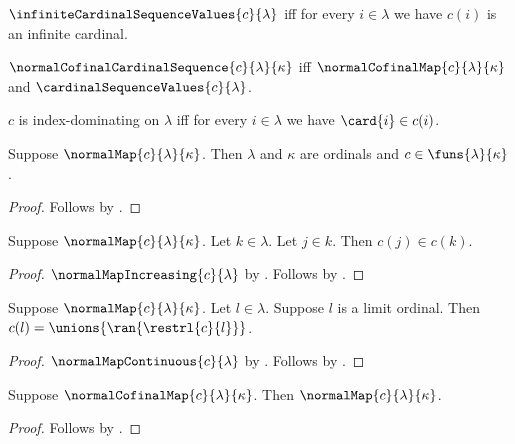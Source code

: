 \begin{definition}\label{infinite_cardinal_sequence_values}
    $\infiniteCardinalSequenceValues{c}{\lambda}$ iff
        for every $i\in\lambda$ we have $c(i)$ is an infinite cardinal.
\end{definition}

\begin{definition}\label{normal_cofinal_cardinal_sequence}
    $\normalCofinalCardinalSequence{c}{\lambda}{\kappa}$ iff
        $\normalCofinalMap{c}{\lambda}{\kappa}$ and
        $\cardinalSequenceValues{c}{\lambda}$.
\end{definition}

\begin{definition}\label{index_dominating}
    $c$ is index-dominating on $\lambda$ iff
        for every $i\in\lambda$ we have $\card{i}\in c(i)$.
\end{definition}

\begin{proposition}\label{normal_map_type}
    Suppose $\normalMap{c}{\lambda}{\kappa}$.
    Then $\lambda$ and $\kappa$ are ordinals and
        $c\in\funs{\lambda}{\kappa}$.
\end{proposition}
\begin{proof}
    Follows by .
\end{proof}

\begin{proposition}\label{normal_map_increasing_elim}
    Suppose $\normalMap{c}{\lambda}{\kappa}$.
    Let $k\in\lambda$.
    Let $j\in k$.
    Then $c(j)\in c(k)$.
\end{proposition}
\begin{proof}
    $\normalMapIncreasing{c}{\lambda}$ by .
    Follows by .
\end{proof}

\begin{proposition}\label{normal_map_continuous_elim}
    Suppose $\normalMap{c}{\lambda}{\kappa}$.
    Let $l\in\lambda$.
    Suppose $l$ is a limit ordinal.
    Then $c(l)=\unions{\ran{\restrl{c}{l}}}$.
\end{proposition}
\begin{proof}
    $\normalMapContinuous{c}{\lambda}$ by .
    Follows by .
\end{proof}

\begin{proposition}\label{normal_cofinal_map_is_normal}
    Suppose $\normalCofinalMap{c}{\lambda}{\kappa}$.
    Then $\normalMap{c}{\lambda}{\kappa}$.
\end{proposition}
\begin{proof}
    Follows by .
\end{proof}

